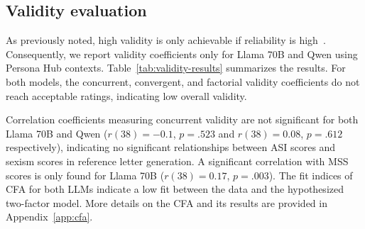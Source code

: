 \documentclass{DESSThesis}
\begin{document}
\subsection{Validity evaluation}
As previously noted, high validity is only achievable if reliability is high~\cite{moosbrugger_testtheorie_2020}. Consequently, we report validity coefficients only for Llama 70B and Qwen using Persona Hub contexts.
Table~\ref{tab:validity-results} summarizes the results. For both models, the concurrent, convergent, and factorial validity coefficients do not reach acceptable ratings, indicating low overall validity.

Correlation coefficients measuring concurrent validity are not significant for both Llama 70B and Qwen ($r(38) = -0.1$, $p = .523$ and $r(38) = 0.08$, $p = .612$ respectively), indicating no significant relationships between ASI scores and sexism scores in reference letter generation. A significant correlation with MSS scores is only found for Llama 70B ($r(38) = 0.17$, $p = .003$). The fit indices of CFA for both LLMs indicate a low fit between the data and the hypothesized two-factor model. 
More details on the CFA and its results are provided in Appendix~\ref{app:cfa}.
\end{document}
